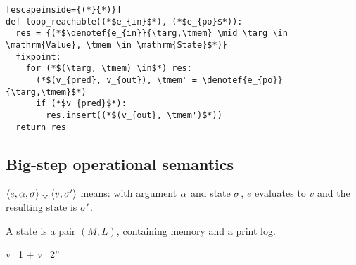 \begin{lstlisting}[escapeinside={(*}{*)}]
def loop_reachable((*$e_{in}$*), (*$e_{po}$*)):
  res = {(*$\denotef{e_{in}}{\targ,\tmem} \mid \targ \in \mathrm{Value}, \tmem \in \mathrm{State}$*)}
  fixpoint:
    for (*$(\targ, \tmem) \in$*) res:
      (*$(v_{pred}, v_{out}), \tmem' = \denotef{e_{po}}{\targ,\tmem}$*)
      if (*$v_{pred}$*):
        res.insert((*$(v_{out}, \tmem')$*))
  return res
\end{lstlisting}


\newpage

\subsection*{Big-step operational semantics}

$\langle e, \alpha, \sigma \rangle \Downarrow \langle v, \sigma' \rangle$ means: with argument $\alpha$ and state $\sigma$, $e$ evaluates to $v$ and the resulting state is $\sigma'$.

A state is a pair $(M, L)$, containing memory and a print log.



{\easvsd
  {}{\targ}{\tmem}
  {v_1 + v_2}{\tmem''}}

